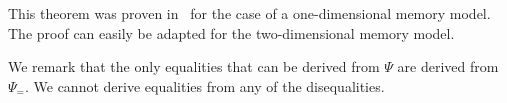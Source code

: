 This theorem was proven in~\cite{2pointer} for the case of a one-dimensional memory model.
The proof can easily be adapted for the two-dimensional memory model.

We remark that the only equalities that can be derived from $\Psi$ are derived from $\Psi_=$. We cannot derive equalities from any of the disequalities.
